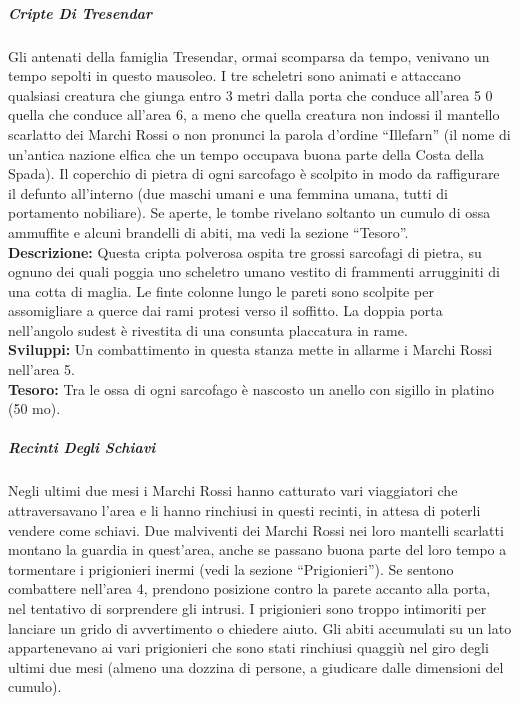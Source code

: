 \documentclass{article}
\begin{document}
        \subparagraph{Cripte Di Tresendar}
                Gli antenati della famiglia Tresendar, ormai scomparsa da
        tempo, venivano un tempo sepolti in questo mausoleo. I tre scheletri sono animati e attaccano qualsiasi creatura
        che giunga entro 3 metri dalla porta che conduce all'area 5 0
        quella che conduce all’area 6, a meno che quella creatura non
        indossi il mantello scarlatto dei Marchi Rossi o non pronunci
        la parola d'ordine “Illefarn” (il nome di un'antica nazione elfica
        che un tempo occupava buona parte della Costa della Spada).
        Il coperchio di pietra di ogni sarcofago è scolpito in modo
        da raffigurare il defunto all’interno (due maschi umani e una
        femmina umana, tutti di portamento nobiliare). Se aperte, le
        tombe rivelano soltanto un cumulo di ossa ammuffite e alcuni
        brandelli di abiti, ma vedi la sezione “Tesoro”.\\
                \textbf{Descrizione: }Questa cripta polverosa ospita tre grossi sarcofagi di pietra,
        su ognuno dei quali poggia uno scheletro umano vestito di
        frammenti arrugginiti di una cotta di maglia. Le finte colonne
        lungo le pareti sono scolpite per assomigliare a querce dai
        rami protesi verso il soffitto. La doppia porta nell’angolo
        sudest è rivestita di una consunta placcatura in rame.\\
        \textbf{Sviluppi: }Un combattimento in questa stanza mette in allarme i Marchi
        Rossi nell’area 5.\\
        \textbf{Tesoro: }Tra le ossa di ogni sarcofago è nascosto un anello con sigillo
        in platino (50 mo).

        \subparagraph{Recinti Degli Schiavi} Negli ultimi due mesi i Marchi Rossi hanno catturato vari
        viaggiatori che attraversavano l’area e li hanno rinchiusi in
        questi recinti, in attesa di poterli vendere come schiavi. Due malviventi dei Marchi Rossi nei loro mantelli scarlatti
        montano la guardia in quest'area, anche se passano buona
        parte del loro tempo a tormentare i prigionieri inermi (vedi
        la sezione “Prigionieri”). Se sentono combattere nell’area
        4, prendono posizione contro la parete accanto alla porta,
        nel tentativo di sorprendere gli intrusi. I prigionieri sono
        troppo intimoriti per lanciare un grido di avvertimento o
        chiedere aiuto. Gli abiti accumulati su un lato appartenevano ai vari
        prigionieri che sono stati rinchiusi quaggiù nel giro degli
        ultimi due mesi (almeno una dozzina di persone, a giudicare
        dalle dimensioni del cumulo).\\
\end{document}
